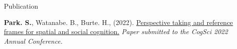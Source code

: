 \documentclass{resume} %
\begin{document}
\begin{rSection}{Publication}
	\setlength{\hangingindent}{1.27cm}
    
        
        
	
	\begin{hangingpar}
		
		\textbf{Park. S.}, Watanabe. B., Burte. H., (2022). 
		\href{https://escholarship.org/uc/item/6wq5x6nn}{Perspective taking and reference frames for spatial and social cognition.} 
		\em{Paper submitted to the CogSci 2022 Annual Conference.}
		
	\end{hangingpar}
	
\end{rSection}
\end{document}
